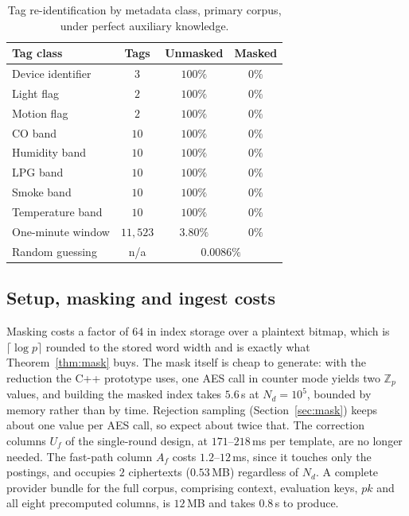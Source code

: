 \documentclass[a4paper,fleqn]{cas-sc}
\newif\ifauthorchecks
\newcommand{\authorcheck}[1]{\ifauthorchecks{\color{red}\textsf{[Authors: #1]}}\fi}
\begin{document}
\begin{table}[pos=htbp]
\caption{Tag re-identification by metadata class, primary corpus, under
perfect auxiliary knowledge.}
\label{tab:leakage}
\centering
\footnotesize
\setlength{\tabcolsep}{3pt}
\renewcommand{\arraystretch}{1.15}
\begin{tabular*}{\tblwidth}{@{\extracolsep{\fill}}lccc@{}}
\toprule
Tag class & Tags & Unmasked & Masked \\
\midrule
Device identifier      & $3$      & $100\%$ & $0\%$ \\
Light flag             & $2$      & $100\%$ & $0\%$ \\
Motion flag            & $2$      & $100\%$ & $0\%$ \\
CO band                & $10$     & $100\%$ & $0\%$ \\
Humidity band          & $10$     & $100\%$ & $0\%$ \\
LPG band               & $10$     & $100\%$ & $0\%$ \\
Smoke band             & $10$     & $100\%$ & $0\%$ \\
Temperature band       & $10$     & $100\%$ & $0\%$ \\
One-minute window      & $11{,}523$ & $3.80\%$ & $0\%$ \\
\midrule
Random guessing        & n/a      & \multicolumn{2}{c}{$0.0086\%$} \\
\bottomrule
\end{tabular*}
\end{table}

\subsection{Setup, masking and ingest costs}
\label{sec:setupresult}
Masking costs a factor of $64$ in index storage over a plaintext bitmap, which
is $\lceil\log p\rceil$ rounded to the stored word width and is exactly what
Theorem~\ref{thm:mask} buys. The mask itself is cheap to generate: with the
reduction the C++ prototype uses, one AES call in counter mode yields two
$\mathbb{Z}_p$ values, and building the masked index takes $5.6$\,s at
$N_d=10^5$, bounded by memory rather than by time. Rejection sampling
(Section~\ref{sec:mask}) keeps about one value per AES call, so expect about
twice that. \authorcheck{Re-measure the masked-index build with rejection
sampling in C++.} The correction columns $U_f$ of the single-round design, at
$171$--$218$\,ms per template, are no longer needed. The fast-path column
$A_f$ costs $1.2$--$12$\,ms, since it touches only the postings, and occupies $2$
ciphertexts ($0.53$\,MB) regardless of $N_d$. A complete provider bundle for
the full corpus, comprising context, evaluation keys, $pk$ and all eight
precomputed columns, is $12$\,MB and takes $0.8$\,s to produce.
\end{document}
